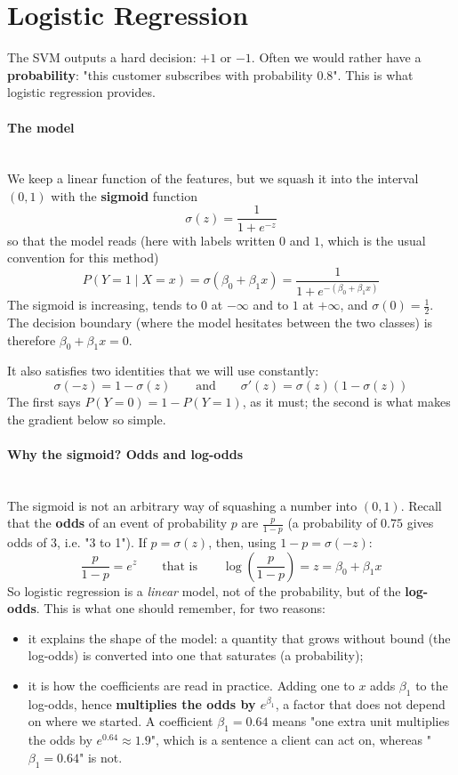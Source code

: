 \documentclass[]{article}
\begin{document}
	\section{Logistic Regression}

	The SVM outputs a hard decision: $+1$ or $-1$.
	Often we would rather have a \textbf{probability}: "this customer subscribes with probability $0.8$".
	This is what logistic regression provides.

	\paragraph{The model}
	\noindent\\
	We keep a linear function of the features, but we squash it into the interval $(0,1)$ with the \textbf{sigmoid} function
	$$
	\sigma(z) = \frac{1}{1 + e^{-z}}
	$$
	so that the model reads (here with labels written $0$ and $1$, which is the usual convention for this method)
	$$
	P(Y = 1 \mid X = x) = \sigma\left(\beta_0 + \beta_1 x\right) = \frac{1}{1 + e^{-(\beta_0 + \beta_1 x)}}
	$$
	The sigmoid is increasing, tends to $0$ at $-\infty$ and to $1$ at $+\infty$, and $\sigma(0) = \frac{1}{2}$.
	The decision boundary (where the model hesitates between the two classes) is therefore $\beta_0 + \beta_1 x = 0$.

	It also satisfies two identities that we will use constantly:
	$$
	\sigma(-z) = 1 - \sigma(z)
	\qquad \text{and} \qquad
	\sigma'(z) = \sigma(z)\left(1 - \sigma(z)\right)
	$$
	The first says $P(Y=0) = 1 - P(Y=1)$, as it must; the second is what makes the gradient below so simple.

	\paragraph{Why the sigmoid? Odds and log-odds}
	\noindent\\
	The sigmoid is not an arbitrary way of squashing a number into $(0,1)$.
	Recall that the \textbf{odds} of an event of probability $p$ are $\frac{p}{1-p}$ (a probability of $0.75$ gives odds of $3$, i.e. "3 to 1").
	If $p = \sigma(z)$, then, using $1 - p = \sigma(-z)$:
	$$
	\frac{p}{1-p} = e^{z}
	\qquad \text{that is} \qquad
	\log\left(\frac{p}{1-p}\right) = z = \beta_0 + \beta_1 x
	$$
	So logistic regression is a \textit{linear} model, not of the probability, but of the \textbf{log-odds}.
	This is what one should remember, for two reasons:
	\begin{itemize}
		\item it explains the shape of the model: a quantity that grows without bound (the log-odds) is converted into one that saturates (a probability);
		\item it is how the coefficients are read in practice.
		Adding one to $x$ adds $\beta_1$ to the log-odds, hence \textbf{multiplies the odds by $e^{\beta_1}$}, a factor that does not depend on where we started.
		A coefficient $\beta_1 = 0.64$ means "one extra unit multiplies the odds by $e^{0.64} \approx 1.9$", which is a sentence a client can act on, whereas "$\beta_1 = 0.64$" is not.
	\end{itemize}
\end{document}
